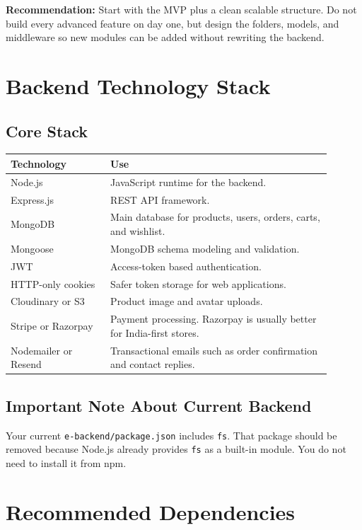 \documentclass[11pt,a4paper]{article}
\begin{document}
\textbf{Recommendation:} Start with the MVP plus a clean scalable structure. Do not build every advanced feature on day one, but design the folders, models, and middleware so new modules can be added without rewriting the backend.

\section{Backend Technology Stack}

\subsection{Core Stack}

\begin{longtable}{p{0.28\linewidth} p{0.62\linewidth}}
\toprule
\textbf{Technology} & \textbf{Use} \\
\midrule
Node.js & JavaScript runtime for the backend. \\
Express.js & REST API framework. \\
MongoDB & Main database for products, users, orders, carts, and wishlist. \\
Mongoose & MongoDB schema modeling and validation. \\
JWT & Access-token based authentication. \\
HTTP-only cookies & Safer token storage for web applications. \\
Cloudinary or S3 & Product image and avatar uploads. \\
Stripe or Razorpay & Payment processing. Razorpay is usually better for India-first stores. \\
Nodemailer or Resend & Transactional emails such as order confirmation and contact replies. \\
\bottomrule
\end{longtable}

\subsection{Important Note About Current Backend}

Your current \texttt{e-backend/package.json} includes \texttt{fs}. That package should be removed because Node.js already provides \texttt{fs} as a built-in module. You do not need to install it from npm.

\section{Recommended Dependencies}
\end{document}
